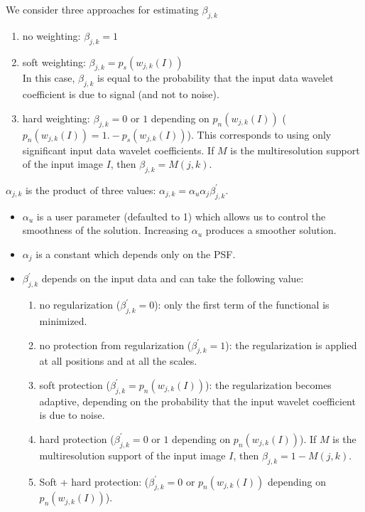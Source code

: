 We consider three approaches for estimating $\beta_{j,k}$
\begin{enumerate}
\item no weighting: $\beta_{j,k} = 1$ 
\item soft weighting: $\beta_{j,k} = p_s(w_{j,k}(I))$  \\
In this case, $\beta_{j,k}$ is equal to the probability that the input
data wavelet coefficient is due to signal (and not to noise).  
\item hard weighting: $\beta_{j,k} = 0$ or $1$ depending on $p_n(w_{j,k}(I))$
($p_n(w_{j,k}(I)) = 1. - p_s(w_{j,k}(I))$).
This 
corresponds to using only significant input data wavelet coefficients. If $M$
is the multiresolution support 
of the input image $I$, then $\beta_{j,k} = M(j,k)$.
\end{enumerate}

$\alpha_{j,k}$ is the product of three values: 
$\alpha_{j,k} = \alpha_u \alpha_{j} \beta^\prime_{j,k}$.
\begin{itemize}
\item{$\alpha_u$ } is a user parameter (defaulted to 1) which allows us
to control the smoothness of the solution. Increasing $\alpha_u$ produces
a smoother solution.
\item{$\alpha_j$ } is a constant which depends only on the PSF.
\item{$\beta^\prime_{j,k}$ } depends on the input data and can take the
following value:
\begin{enumerate}
\item no regularization ($\beta^\prime_{j,k} = 0$):   
only the first term of the functional is minimized.
\item no protection from regularization ($\beta^\prime_{j,k} = 1$): the regularization is applied at all positions and
at all the scales.
\item soft protection ($\beta^\prime_{j,k} = p_n(w_{j,k}(I))$): 
the regularization becomes adaptive,
depending on the probability that the input wavelet coefficient is due 
to noise.
\item hard protection ($\beta^\prime_{j,k} = 0$ or $1$ depending 
on $p_n(w_{j,k}(I))$). If $M$
is the multiresolution support 
of the input image $I$, then $\beta_{j,k} = 1 - M(j,k)$.
\item Soft + hard protection: 
($\beta^\prime_{j,k} = 0$ or $p_n(w_{j,k}(I))$ 
depending on $p_n(w_{j,k}(I))$).
\end{enumerate}

\end{itemize}
 
